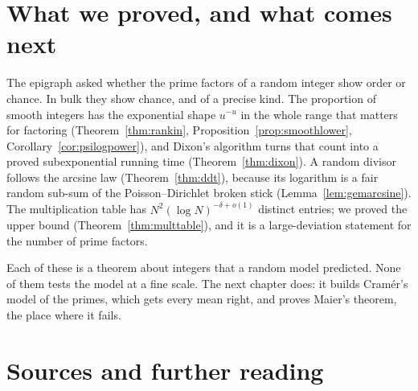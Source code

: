 \section{What we proved, and what comes next}

The epigraph asked whether the prime factors of a random integer show order or chance. In bulk they show chance, and of a precise kind. The proportion of smooth integers has the exponential shape $u^{-u}$ in the whole range that matters for factoring (Theorem~\ref{thm:rankin}, Proposition~\ref{prop:smoothlower}, Corollary~\ref{cor:psilogpower}), and Dixon's algorithm turns that count into a proved subexponential running time (Theorem~\ref{thm:dixon}). A random divisor follows the arcsine law (Theorem~\ref{thm:ddt}), because its logarithm is a fair random sub-sum of the Poisson--Dirichlet broken stick (Lemma~\ref{lem:gemarcsine}). The multiplication table has $N^2(\log N)^{-\delta+o(1)}$ distinct entries; we proved the upper bound (Theorem~\ref{thm:multtable}), and it is a large-deviation statement for the number of prime factors.

Each of these is a theorem about integers that a random model predicted. None of them tests the model at a fine scale. The next chapter does: it builds Cram\'er's model of the primes, which gets every mean right, and proves Maier's theorem, the place where it fails.

\section*{Sources and further reading}

